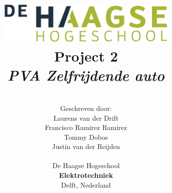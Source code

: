 \title{
\includegraphics[width=3.5in]{IMG/HHS.png} \\
\vspace*{1in}
\textbf{Project 2}\\
\textit{PVA Zelfrijdende auto}
}
\author{
\vspace*{0.3in} \\
  Geschreven door:\\
  Laurens van der Drift\\
  Francisco Ramirez Ramirez\\
  Tommy Dobos\\
  Justin van der Reijden\\
		\vspace*{1.2in} \\
		De Haagse Hogeschool\\
        \textbf{Elektrotechniek}\\
        Delft, Nederland
       } 